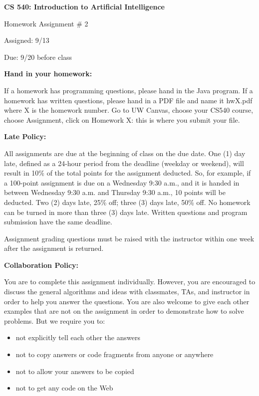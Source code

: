 \documentclass{article}
\begin{document}
\begin{center}
{\bf \large CS 540: Introduction to Artificial Intelligence

Homework Assignment \# 2

\vspace{0.5cm}

Assigned:  9/13 

Due:  9/20 before class} 
\end{center}

\vspace{1cm}

\begin{center}
{\bf \Large Hand in your homework:}
\end{center}

If a homework has programming questions, please hand in the Java program.  
If a homework has written questions, please hand in a PDF file and name it hwX.pdf where X is the homework number.
Go to UW Canvas, choose your CS540 course, choose Assignment, click on Homework X: this is where you submit your file. 

\vspace{1cm}

\begin{center}
{\bf \Large Late Policy:}
\end{center}

All assignments are due at the beginning of class on the due date. One (1) day late, defined as a 24-hour period from the deadline (weekday or weekend), will result in 10\% of the  total points for the assignment deducted.  So, for example, if a 100-point assignment is due on a Wednesday 9:30 a.m., and it is handed in between Wednesday 9:30 a.m. and Thursday 9:30 a.m., 10 points will be deducted. Two (2) days late, 25\% off; three (3) days late, 50\% off. No homework can be turned in more than three (3) days late. Written questions and program submission have the same deadline.  

Assignment grading questions must be raised with the instructor within one week after the assignment is returned.

\vspace{4pt}

\begin{center}
{\bf \Large Collaboration Policy:}
\end{center}

You  are  to  complete  this  assignment  individually.  However,  you  are  encouraged  to  discuss  the  general algorithms and ideas with classmates, TAs, and instructor in order to help you answer the questions. You are also welcome to give each other examples that are not on the assignment in order to demonstrate how to solve problems. But we require you to:
\begin{itemize}
\item not explicitly tell each other the answers
\item not to copy answers or code fragments from anyone or anywhere
\item not to allow your answers to be copied
\item not to get any code on the Web
\end{itemize}
\end{document}
